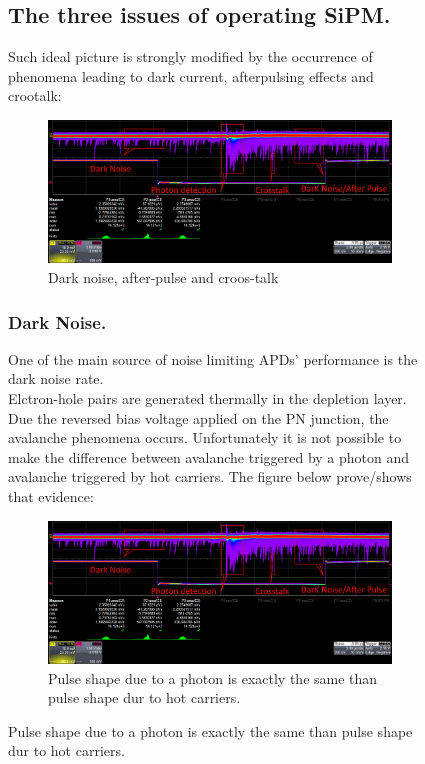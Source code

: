 \documentclass[a4paper, 11pt]{report}%
\begin{document}
\begin{figure}[!hbtp]
  \subsection{The three issues of operating SiPM.} 
  
  Such ideal picture is strongly modified by the occurrence of phenomena leading to dark current, afterpulsing effects and crootalk: 
  
  \begin{figure}[!hbtp]
  \centering
  \includegraphics[totalheight=0.22\textwidth,trim=0cm 6.5cm 0cm 0cm, clip=true]{Pictures/blabla/DN_AP_CT_1.png}
  \caption{Dark noise, after-pulse and croos-talk}
  \label{fig:DN_AP_CT}
  \end{figure}
  
  \subsubsection{Dark Noise.}
  
  One of the main source of noise limiting APDs' performance is the dark noise rate.\\
  Elctron-hole pairs are generated thermally in the depletion layer. Due the reversed bias voltage applied on the PN junction, 
  the avalanche phenomena occurs.
  Unfortunately it is not possible to make the difference between avalanche triggered by a photon and avalanche triggered by hot carriers.
  The figure below prove/shows that evidence:
  
  \begin{figure}[!hbtp]
  \centering
  \includegraphics[totalheight=0.22\textwidth,trim=0cm 6.5cm 0cm 0cm, clip=true]{Pictures/blabla/DN_AP_CT_1.png}
  \caption{Pulse shape due to a photon is exactly the same than pulse shape dur to hot carriers.}
  \label{fig:DN_photon}
  \end{figure}
  

\end{figure}
\end{document}
